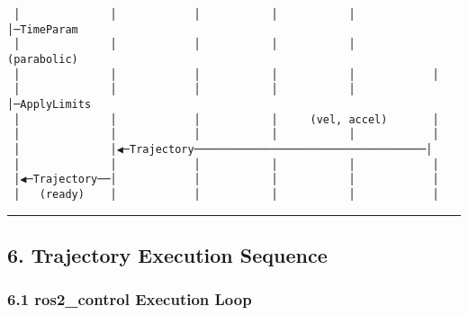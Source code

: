 \documentclass[
]{article}
\begin{document}
\begin{verbatim}
 │              │            │           │           │            │─TimeParam
 │              │            │           │           │       (parabolic)
 │              │            │           │           │            │
 │              │            │           │           │            │─ApplyLimits
 │              │            │           │     (vel, accel)       │
 │              │            │           │           │            │
 │              │◀─Trajectory────────────────────────────────────│
 │              │            │           │           │            │
 │◀─Trajectory──│            │           │           │            │
 │   (ready)    │            │           │           │            │
\end{verbatim}

\begin{center}\rule{0.5\linewidth}{0.5pt}\end{center}

\hypertarget{trajectory-execution-sequence}{%
\subsection{6. Trajectory Execution
Sequence}\label{trajectory-execution-sequence}}

\hypertarget{ros2_control-execution-loop}{%
\subsubsection{6.1 ros2\_control Execution
Loop}\label{ros2_control-execution-loop}}
\end{document}
